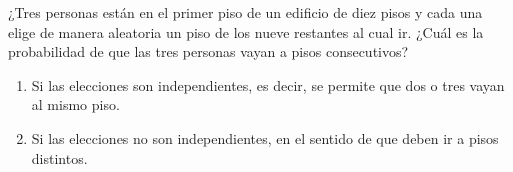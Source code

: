 \documentclass[12pt,a4paper]{article}
\begin{document}
    \begin{mdframed}[style=mdbluebox,frametitle={Ejercicio 2}]
        ¿Tres personas están en el primer piso de un edificio de diez pisos y cada una elige de manera 
        aleatoria un piso de los nueve restantes al cual ir. ¿Cuál es la probabilidad de que las tres 
        personas vayan a pisos consecutivos?
        \begin{enumerate}
            \item[(a)] Si las elecciones son independientes, es decir, se permite que dos o tres vayan al mismo piso.
            \item[(b)] Si las elecciones no son independientes, en el sentido de que deben ir a pisos distintos.
        \end{enumerate}
    \end{mdframed}
\end{document}
